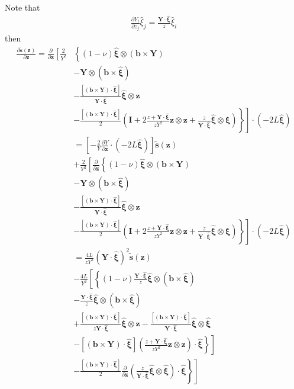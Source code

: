 Note that 
\begin{align}
\frac{\partial {Y_i}}{\partial z_j}\hat{\xi}_j=\frac{\bm Y\cdot\hat{\bm\xi}}{z}\hat{\xi}_i
\end{align}
then
\begin{align}
\frac{\partial \tilde {\bm s}(\bm z)}{\partial \bm z}
=\frac{\partial}{\partial \bm z}\left[\frac{2}{Y^2}\right.&
\left\{
(1-\nu)\hat{\bm\xi}\otimes\left(\bm b\times \bm Y\right)\right.\nonumber\\
&-\bm Y\otimes\left(\bm b\times\hat{\bm \xi}\right)\nonumber\\
&-\frac{\left[\left(\bm b\times\bm Y\right)\cdot\hat{\bm \xi}\right]}{\bm Y\cdot \hat{\bm \xi}}\hat{\bm\xi}\otimes\bm z\nonumber\\
&\left.\left.-\frac{\left[\left(\bm b\times\bm Y\right)\cdot\hat{\bm \xi}\right]}{2}\left(\bm I+2\frac{z+\bm Y\cdot \hat{\bm \xi}}{zY^2}\bm z\otimes\bm z+\frac{z}{\bm Y\cdot \hat{\bm \xi}}\hat{\bm\xi}\otimes\hat{\bm\xi}\right)\right\}\right]\cdot(-2L\hat{\bm \xi})\nonumber\\
%
&=\left[-\frac{2}{Y}\frac{\partial Y}{\partial \bm z}\cdot\left(-2L\hat{\bm \xi}\right)\right]\tilde{\bm s}(\bm z)\nonumber\\
&+\frac{2}{Y^2}\left[\frac{\partial}{\partial \bm z}
\left\{
(1-\nu)\hat{\bm\xi}\otimes\left(\bm b\times \bm Y\right)\right.\right.\nonumber\\
&-\bm Y\otimes\left(\bm b\times\hat{\bm \xi}\right)\nonumber\\
&-\frac{\left[\left(\bm b\times\bm Y\right)\cdot\hat{\bm \xi}\right]}{\bm Y\cdot \hat{\bm \xi}}\hat{\bm\xi}\otimes\bm z\nonumber\\
&\left.\left.-\frac{\left[\left(\bm b\times\bm Y\right)\cdot\hat{\bm \xi}\right]}{2}\left(\bm I+2\frac{z+\bm Y\cdot \hat{\bm \xi}}{zY^2}\bm z\otimes\bm z+\frac{z}{\bm Y\cdot \hat{\bm \xi}}\hat{\bm\xi}\otimes\hat{\bm\xi}\right)\right\}\right]\cdot(-2L\hat{\bm \xi})\nonumber\\
%
&=\frac{4L}{zY^2}\left(\bm Y\cdot\hat{\bm \xi}\right)^2\tilde{\bm s}(\bm z)\nonumber\\
&-\frac{4L}{Y^2}\left[
\left\{
(1-\nu)\frac{\bm Y\cdot\hat{\bm \xi}}{z}\hat{\bm\xi}\otimes\left(\bm b\times \hat{\bm \xi}\right)\right.\right.\nonumber\\
&-\frac{\bm Y\cdot\hat{\bm \xi}}{z}\hat{\bm \xi}\otimes\left(\bm b\times\hat{\bm \xi}\right)\nonumber\\
&+\frac{\left[\left(\bm b\times\bm Y\right)\cdot\hat{\bm \xi}\right]}{z\bm Y\cdot \hat{\bm \xi}}\hat{\bm\xi}\otimes\bm z
-\frac{\left[\left(\bm b\times\bm Y\right)\cdot\hat{\bm \xi}\right]}{\bm Y\cdot \hat{\bm \xi}}\hat{\bm\xi}\otimes\hat{\bm \xi}\nonumber\\
&\left.\left.-\left[\left(\bm b\times\bm Y\right)\cdot\hat{\bm \xi}\right]\left(\frac{z+\bm Y\cdot \hat{\bm \xi}}{zY^2}\bm z\otimes\bm z\right)\cdot\hat{\bm \xi}\right\}\right]\nonumber\\
&\left.\left.-\frac{\left[\left(\bm b\times\bm Y\right)\cdot\hat{\bm \xi}\right]}{2}\frac{\partial}{\partial \bm z}\left(\frac{z}{\bm Y\cdot \hat{\bm \xi}}\hat{\bm\xi}\otimes\hat{\bm\xi}\right)\cdot\hat{\bm \xi}\right\}\right]\nonumber\\
\end{align}

